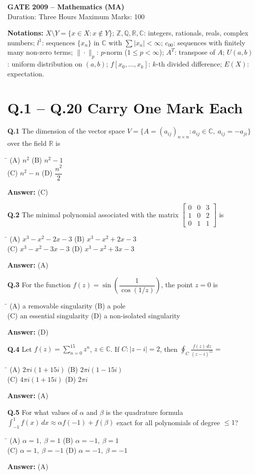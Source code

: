 \documentclass[11pt,a4paper]{article}
\newcommand{\optsfourA}[4]{%
  \begin{tabbing}
    \hspace{0.48\linewidth}\=\kill
    (A) #1 \> (B) #2 \\[2pt]
    (C) #3 \> (D) #4
  \end{tabbing}%
}
\newcommand{\ans}[1]{\textbf{Answer:} #1\par\medskip}
\begin{document}

\begin{center}
  {\Large\bfseries GATE 2009 -- Mathematics (MA)}\\[4pt]
  {\small Duration: Three Hours \quad\textbar\quad Maximum Marks: 100}
\end{center}

\medskip
\textbf{Notations:} $X \setminus Y = \{x \in X : x \notin Y\}$; $\mathbb{Z}, \mathbb{Q}, \mathbb{R}, \mathbb{C}$: integers, rationals, reals, complex numbers; $l^1$: sequences $\{x_n\}$ in $\mathbb{C}$ with $\sum |x_n| < \infty$; $c_{00}$: sequences with finitely many non-zero terms; $\|\cdot\|_p$: $p$-norm ($1 \le p < \infty$); $A^T$: transpose of $A$; $U(a, b)$: uniform distribution on $(a, b)$; $f[x_0, \dots, x_k]$: $k$-th divided difference; $E(X)$: expectation.

\section*{Q.1 -- Q.20 Carry One Mark Each}

\textbf{Q.1} The dimension of the vector space $V = \{A = (a_{ij})_{n \times n} : a_{ij} \in \mathbb{C},\ a_{ij} = -a_{ji}\}$ over the field $\mathbb{R}$ is
\optsfourA{$n^2$}{$n^2 - 1$}{$n^2 - n$}{$\dfrac{n^2}{2}$}
\ans{(C)}

\textbf{Q.2} The minimal polynomial associated with the matrix $\begin{bmatrix} 0 & 0 & 3 \\ 1 & 0 & 2 \\ 0 & 1 & 1 \end{bmatrix}$ is
\optsfourA{$x^3 - x^2 - 2x - 3$}{$x^3 - x^2 + 2x - 3$}{$x^3 - x^2 - 3x - 3$}{$x^3 - x^2 + 3x - 3$}
\ans{(A)}

\textbf{Q.3} For the function $f(z) = \sin\!\left(\dfrac{1}{\cos(1/z)}\right)$, the point $z = 0$ is
\optsfourA{a removable singularity}{a pole}{an essential singularity}{a non-isolated singularity}
\ans{(D)}

\textbf{Q.4} Let $f(z) = \displaystyle\sum_{n=0}^{15} z^n$, $z \in \mathbb{C}$. If $C : |z - i| = 2$, then $\displaystyle\oint_C \frac{f(z)\,dz}{(z - i)^{15}} =$
\optsfourA{$2\pi i(1 + 15i)$}{$2\pi i(1 - 15i)$}{$4\pi i(1 + 15i)$}{$2\pi i$}
\ans{(A)}

\textbf{Q.5} For what values of $\alpha$ and $\beta$ is the quadrature formula $\displaystyle\int_{-1}^{1} f(x)\,dx \approx \alpha f(-1) + f(\beta)$ exact for all polynomials of degree $\le 1$?
\optsfourA{$\alpha = 1,\ \beta = 1$}{$\alpha = -1,\ \beta = 1$}{$\alpha = 1,\ \beta = -1$}{$\alpha = -1,\ \beta = -1$}
\ans{(A)}
\end{document}
